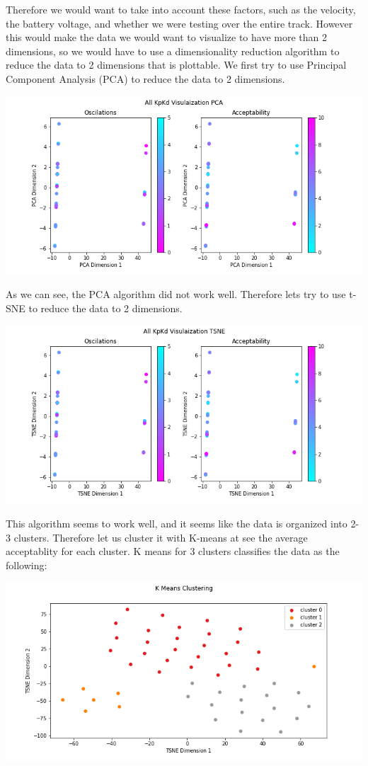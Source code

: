 \documentclass[12pt]{article}
\begin{document}
\begin{multicols}{2}
Therefore we would want to take into account these factors, such as the velocity, the battery voltage, and whether we were testing over the 
entire track. However this would make the data we would want to visualize to have more than 2 dimensions, so we would
have to use a dimensionality reduction algorithm to reduce the data to 2 dimensions that is plottable. We first try to use
Principal Component Analysis (PCA) to reduce the data to 2 dimensions.
\begin{center}
    \includegraphics*[scale=0.3]{KpKiAllPCA.png}
\end{center}
As we can see, the PCA algorithm did not work well. Therefore lets try to use t-SNE to reduce the data to 2 dimensions.
\begin{center}
    \includegraphics*[scale=0.3]{KpKiAllTSNE.png}
\end{center}
This algorithm seems to work well, and it seems like the data is organized into 2-3 clusters. Therefore let us cluster 
it with K-means at see the average acceptablity for each cluster. K means for 3 clusters classifies the data as the following:
\begin{center}
    \includegraphics*[scale=0.3]{KpKiAllTSNEKMeans.png}

\end{center}
\end{multicols}
\end{document}
